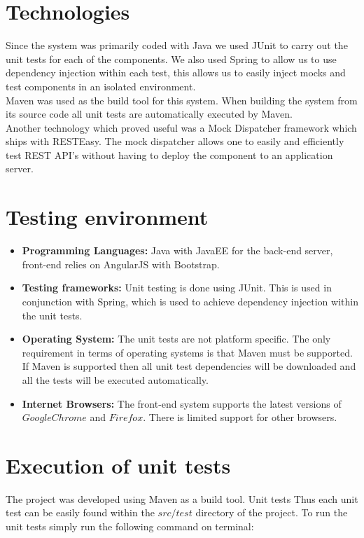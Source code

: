 \documentclass[11pt,a4paper]{article}
\begin{document}
\section{Technologies}

Since the system was primarily coded with Java we used JUnit to carry out the unit tests for each of the components. We also used Spring to allow us to use dependency injection within each test, this allows us to easily inject mocks and test components in an isolated environment. \\

Maven was used as the build tool for this system. When building the system from its source code all unit tests are automatically executed by Maven.  \\

Another technology which proved useful was a Mock Dispatcher framework which ships with RESTEasy. The mock dispatcher allows one to easily and efficiently test REST API's without having to deploy the component to an application server.

\section{Testing environment}
\begin{itemize}
	\item \textbf{Programming Languages:} Java with JavaEE for the back-end server, front-end relies on AngularJS with Bootstrap.
	
	\item \textbf{Testing frameworks: } Unit testing is done using JUnit. This is used in conjunction with Spring, which is used to achieve dependency injection within the unit tests.
	
	\item \textbf{Operating System: } The unit tests are not platform specific. The only requirement in terms of operating systems is that Maven must be supported. If Maven is supported then all unit test dependencies will be downloaded and all the tests will be executed automatically.
	
	\item \textbf{Internet Browsers: } The front-end system supports the latest versions of 
	$Google Chrome$ and $Firefox$. There is limited support for other browsers.
\end{itemize}

\section{Execution of unit tests}	
The project was developed using Maven as a build tool. Unit tests Thus each unit test can be easily found within the $src/test$ directory of the project. To run the unit tests simply run the following command on terminal: \\
\end{document}

